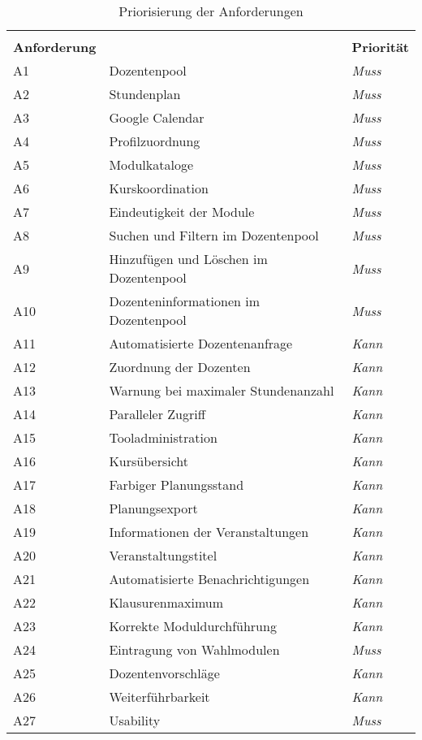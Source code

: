 \begin{table}[h]
	\centering
	\renewcommand*{\arraystretch}{1.25}
	\begin{tabular}{|l|p{8cm}|l|}
		\hline &&\\[-0.5em]
		\textbf{Anforderung} & \head{Kurztitel} & \textbf{Priorität} \\ \hline
		A1 & Dozentenpool & \textit{Muss} \\ \hline
		A2 & Stundenplan & \textit{Muss} \\ \hline
		A3 & Google Calendar & \textit{Muss} \\ \hline
		A4 & Profilzuordnung & \textit{Muss} \\ \hline
		A5 & Modulkataloge & \textit{Muss} \\ \hline
		A6 & Kurskoordination & \textit{Muss} \\ \hline
		A7 & Eindeutigkeit der Module & \textit{Muss} \\ \hline
		A8 & Suchen und Filtern im Dozentenpool & \textit{Muss} \\ \hline
		A9 & Hinzufügen und Löschen im Dozentenpool & \textit{Muss} \\ \hline
		A10 & Dozenteninformationen im Dozentenpool & \textit{Muss} \\ \hline
		A11 & Automatisierte Dozentenanfrage & \textit{Kann} \\ \hline
		A12 & Zuordnung der Dozenten & \textit{Kann} \\ \hline
		A13 & Warnung bei maximaler Stundenanzahl & \textit{Kann} \\ \hline
		A14 & Paralleler Zugriff & \textit{Kann} \\ \hline
		A15 & Tooladministration & \textit{Kann} \\ \hline
		A16 & Kursübersicht & \textit{Kann} \\ \hline
		A17 & Farbiger Planungsstand & \textit{Kann} \\ \hline
		A18 & Planungsexport & \textit{Kann} \\ \hline
		A19 & Informationen der Veranstaltungen & \textit{Kann} \\ \hline
		A20 & Veranstaltungstitel & \textit{Kann} \\ \hline
		A21 & Automatisierte Benachrichtigungen & \textit{Kann} \\ \hline
		A22 & Klausurenmaximum & \textit{Kann} \\ \hline
		A23 & Korrekte Moduldurchführung & \textit{Kann} \\ \hline
		A24 & Eintragung von Wahlmodulen & \textit{Muss} \\ \hline
		A25 & Dozentenvorschläge & \textit{Kann} \\ \hline
		A26 & Weiterführbarkeit & \textit{Kann} \\ \hline
		A27 & Usability & \textit{Muss} \\ \hline
	\end{tabular}
	\captionsetup{format=hang}
	\caption{\label{tab:prios}Priorisierung der Anforderungen \\}
\end{table}


